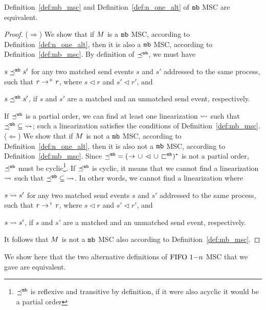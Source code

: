 \begin{proposition}
    Definition~\ref{def:mb_msc} and Definition~\ref{def:n_one_alt} of $\mathtt{mb}$ MSC are equivalent.
\end{proposition}
\begin{proof}
    ($\Rightarrow$)  We show that if $M$ is a $\mathtt{mb}$ MSC, according to Definition~\ref{def:n_one_alt}, then it is also a $\mathtt{mb}$ MSC, according to Definition~\ref{def:mb_msc}. By definition of $\preceq^{\mathtt{mb}}$, we must have 
    \begin{enumerate*}[label={(\roman*)}]
        \item $s \preceq^{\mathtt{mb}} s'$ for any two matched send events $s$ and $s'$ addressed to the same process, such that $r \to^+ r$, where $s \lhd r$ and $s' \lhd r'$, and
        \item $s \preceq^{\mathtt{mb}} s'$, if $s$ and $s'$ are a matched and an unmatched send event, respectively.
    \end{enumerate*} 
    If $\preceq^{\mathtt{mb}}$ is a partial order, we can find at least one linearization $\rightsquigarrow$ such that $\preceq^{\mathtt{mb}} \;\subseteq\; \rightsquigarrow$; such a linearization satisfies the conditions of Definition~\ref{def:mb_msc}.\newline
    ($\Leftarrow$) We show that if $M$ is not a $\mathtt{mb}$ MSC, according to Definition~\ref{def:n_one_alt}, then it is also not a $\mathtt{mb}$ MSC, according to Definition~\ref{def:mb_msc}. Since ${\preceq^{\mathtt{mb}}} = ({\to} \,\cup\, {\lhd} \,\cup\, {\sqsubset^{\mathtt{mb}}})^\ast$ is not a partial order, $\preceq^{\mathtt{mb}}$ must be cyclic\footnote{$\preceq^{\mathtt{mb}}$ is reflexive and transitive by definition, if it were also acyclic it would be a partial order}. If $\preceq^{\mathtt{mb}}$ is cyclic, it means that we cannot find a linearization $\rightsquigarrow$ such that $\preceq^{\mathtt{mb}} \;\subseteq\; \rightsquigarrow$. In other words, we cannot find a linearization where      
    \begin{enumerate*}[label={(\roman*)}]
        \item $s \rightsquigarrow s'$ for any two matched send events $s$ and $s'$ addressed to the same process, such that $r \to^+ r$, where $s \lhd r$ and $s' \lhd r'$, and
        \item $s \rightsquigarrow s'$, if $s$ and $s'$ are a matched and an unmatched send event, respectively.
    \end{enumerate*} 
    It follows that $M$ is not a $\mathtt{mb}$ MSC also according to Definition~\ref{def:mb_msc}.
\end{proof}

We show here that the two alternative definitions of $\text{FIFO } 1\mathsf{-}n$ MSC that we gave are equivalent.


